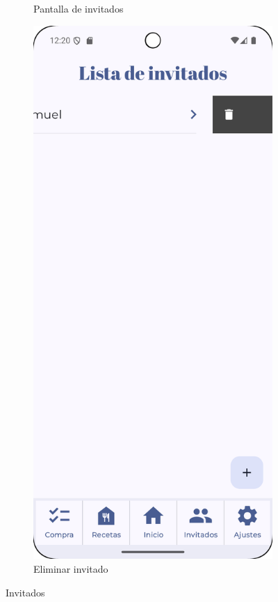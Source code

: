 \begin{figure}[H]
\begin{subfigure}[b]{0.3\textwidth}
      \caption{Pantalla de invitados}
      \label{fig:guest-not-empty}
    \end{subfigure}
    \hfill
    \begin{subfigure}[b]{0.3\textwidth}
      \includegraphics[width=\textwidth]{./img/manual/delete_guest.png}
      \caption{Eliminar invitado}
      \label{fig:delete-guest}
    \end{subfigure}

    \caption{Invitados}
    \label{fig:guests}
\end{figure}